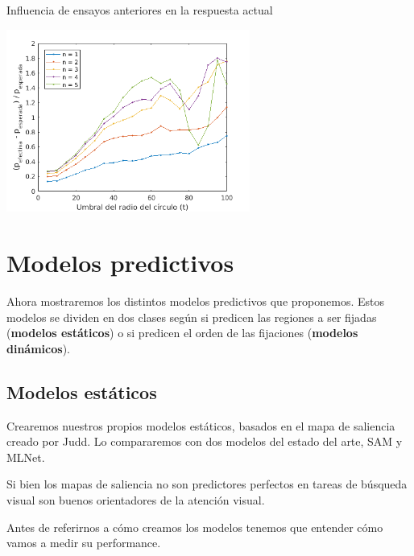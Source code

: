 \documentclass[compress]{beamer}
\begin{document}
\begin{frame}{Influencia de ensayos anteriores en la respuesta actual}
\begin{center}
\includegraphics[width=0.6\textwidth]{images/desconfianza-rta-dif-relativa.png}
\end{center}
\end{frame}

\section{Modelos predictivos}
\begin{frame}
Ahora mostraremos los distintos modelos predictivos que proponemos. Estos modelos se dividen en dos clases según si predicen las regiones a ser fijadas (\textbf{modelos estáticos}) o si predicen el orden de las fijaciones (\textbf{modelos dinámicos}).
\end{frame}

\subsection{Modelos estáticos}

\begin{frame}
Crearemos nuestros propios modelos estáticos, basados en el mapa de saliencia creado por Judd. Lo compararemos con dos modelos del estado del arte, SAM y MLNet. 

\medskip
Si bien los mapas de saliencia no son predictores perfectos en tareas de búsqueda visual son buenos orientadores de la atención visual.

\bigskip
\bigskip
Antes de referirnos a cómo creamos los modelos tenemos que entender cómo vamos a medir su performance.
\end{frame}
\end{document}

